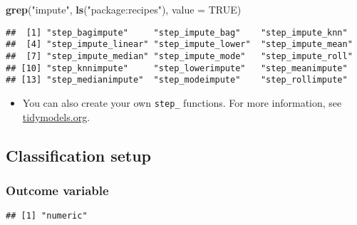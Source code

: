 \documentclass[
]{book}
\newenvironment{Shaded}{\begin{snugshade}}{\end{snugshade}}
\newcommand{\DataTypeTok}[1]{\textcolor[rgb]{0.13,0.29,0.53}{#1}}
\newcommand{\KeywordTok}[1]{\textcolor[rgb]{0.13,0.29,0.53}{\textbf{#1}}}
\newcommand{\NormalTok}[1]{#1}
\newcommand{\OperatorTok}[1]{\textcolor[rgb]{0.81,0.36,0.00}{\textbf{#1}}}
\newcommand{\OtherTok}[1]{\textcolor[rgb]{0.56,0.35,0.01}{#1}}
\newcommand{\StringTok}[1]{\textcolor[rgb]{0.31,0.60,0.02}{#1}}
\providecommand{\tightlist}{%
  \setlength{\itemsep}{0pt}\setlength{\parskip}{0pt}}
\begin{document}
\begin{Shaded}
\begin{Highlighting}[]
\KeywordTok{grep}\NormalTok{(}\StringTok{"impute"}\NormalTok{, }\KeywordTok{ls}\NormalTok{(}\StringTok{"package:recipes"}\NormalTok{), }\DataTypeTok{value =} \OtherTok{TRUE}\NormalTok{)}
\end{Highlighting}
\end{Shaded}

\begin{verbatim}
##  [1] "step_bagimpute"     "step_impute_bag"    "step_impute_knn"   
##  [4] "step_impute_linear" "step_impute_lower"  "step_impute_mean"  
##  [7] "step_impute_median" "step_impute_mode"   "step_impute_roll"  
## [10] "step_knnimpute"     "step_lowerimpute"   "step_meanimpute"   
## [13] "step_medianimpute"  "step_modeimpute"    "step_rollimpute"
\end{verbatim}

\begin{itemize}
\tightlist
\item
  You can also create your own \texttt{step\_} functions. For more information, see \href{https://www.tidymodels.org/learn/develop/recipes/}{tidymodels.org}.
\end{itemize}

\hypertarget{classification-setup}{%
\subsection{Classification setup}\label{classification-setup}}

\hypertarget{outcome-variable-1}{%
\subsubsection{Outcome variable}\label{outcome-variable-1}}

\begin{Shaded}
\end{Shaded}

\begin{verbatim}
## [1] "numeric"
\end{verbatim}

\begin{Shaded}
\end{Shaded}
\end{document}
